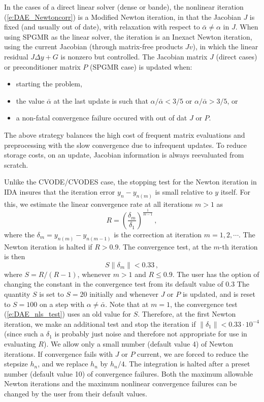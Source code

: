 In the cases of a direct linear solver (dense or bande), the nonlinear 
iteration (\ref{e:DAE_Newtoncorr}) is a Modified Newton iteration, in
that the Jacobian $J$ is fixed (and usually out of date), with
relaxation with respect to $\bar\alpha \neq \alpha$ in $J$. When using
SPGMR as the linear solver, the iteration is an Inexact Newton iteration,
using the current Jacobian (through matrix-free products $Jv$), in 
which the linear residual $J\Delta y + G$ is nonzero but controlled.
The Jacobian matrix $J$ (direct cases) or preconditioner matrix $P$ 
(SPGMR case) is updated when:
\begin{itemize}
\item starting the problem,
\item the value $\bar\alpha$ at the last update is such that
  $\alpha / {\bar\alpha} < 3/5$ or $\alpha / {\bar\alpha} > 3/5$, or
\item a non-fatal convergence failure occured with out of dat $J$ or $P$.
\end{itemize}
The above strategy balances the high cost of frequent matrix evaluations
and preprocessing with the slow convergence due to infrequent updates.
To reduce storage costs, on an update, Jacobian information is always
reevaluated from scratch.

Unlike the CVODE/CVODES case, the stopping test for the Newton iteration
in IDA insures that the iteration error $y_n - y_{n(m)}$ is small relative
to $y$ itself. For this, we estimate the linear convergence rate at all 
iterations $m>1$ as
\begin{equation*}
R = \left( \frac{\delta_m}{\delta_1} \right)^{\frac{1}{m-1}} \, , 
\end{equation*}
where the $\delta_m = y_{n(m)} - y_{n(m-1)}$ is the correction at
iteration $m=1,2,\cdots$. The Newton iteration is halted if $R>0.9$.
The convergence test, at the $m$-th iteration is then
\begin{equation}\label{e:DAE_nls_test}
S \| \delta_m \| < 0.33 \, ,
\end{equation}
where $S = R/(R-1)$, whenever $m>1$ and $R\le 0.9$. The user has the
option of changing the constant in the convergence test from its default 
value of $0.3$
%
The quantity $S$ is set to $S=20$ initially and whenever $J$ or $P$ is
updated, and is reset to $S=100$ on a step with $\alpha \neq \bar\alpha$.
Note that at $m=1$, the convergence test (\ref{e:DAE_nls_test}) uses an old 
value for $S$. Therefore, at the first Newton iteration, we make an additional
test and stop the iteration if $\|\delta_1\| < 0.33 \cdot 10^{-4}$
(since such a $\delta_1$ is probably just noise and therefore not appropriate 
for use in evaluating $R$).
%
We allow only a small number (default value 4) of Newton iterations.
If convergence fails with $J$ or $P$ current, 
we are forced to reduce the stepsize $h_n$, and we replace $h_n$ by $h_n/4$.
The integration is halted after a preset number (default value 10)
of convergence failures. Both the maximum allowable Newton iterations
and the maximum nonlinear convergence failures can be changed by the user
from their default values.

